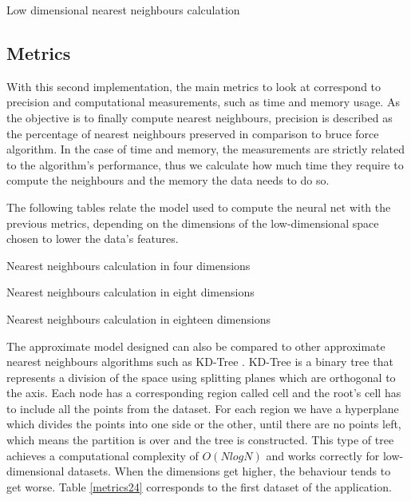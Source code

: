 \documentclass[a4paper,11pt,spanish]{report}
\makeatletter
\def\BState{\State\hskip-\ALG@thistlm}
\makeatother
\begin{document}
\begin{algorithm}
\caption{Low dimensional nearest neighbours calculation}
\end{algorithm}

\subsection{Metrics}
\label{ssec:met2}

With this second implementation, the main metrics to look at correspond to precision and computational measurements, such as time and memory usage. As the objective is to finally compute nearest neighbours, precision is described as the percentage of nearest neighbours preserved in comparison to bruce force algorithm. In the case of time and memory, the measurements are strictly related to the algorithm's performance, thus we calculate how much time they require to compute the neighbours and the memory the data needs to do so.

The following tables relate the model used to compute the neural net with the previous metrics, depending on the dimensions of the low-dimensional space chosen to lower the data's features.

\begin{table}[p]
\centering

\caption{\label{metrics21}Nearest neighbours calculation in four dimensions}
\end{table}

\begin{table}[p]
\centering

\caption{\label{metrics22}Nearest neighbours calculation in eight dimensions}
\end{table}

\begin{table}[p]
\centering

\caption{\label{metrics23}Nearest neighbours calculation in eighteen dimensions}
\end{table}

The approximate model designed can also be compared to other approximate nearest neighbours algorithms such as KD-Tree \citep{kdtree}. KD-Tree is a binary tree that represents a division of the space using splitting planes which are orthogonal to the axis. Each node has a corresponding region called cell and the root's cell has to include all the points from the dataset. For each region we have a hyperplane which divides the points into one side or the other, until there are no points left, which means the partition is over and the tree is constructed. This type of tree achieves a computational complexity of $O(NlogN)$ and works correctly for low-dimensional datasets. When the dimensions get higher, the behaviour tends to get worse. Table \ref{metrics24} corresponds to the first dataset of the application.
\end{document}
